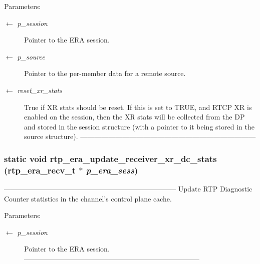 \begin{Desc}
\item[Parameters:]
\begin{description}
\item[\mbox{$\leftarrow$} {\em p\_\-session}]Pointer to the ERA session. \item[\mbox{$\leftarrow$} {\em p\_\-source}]Pointer to the per-member data for a remote source. \item[\mbox{$\leftarrow$} {\em reset\_\-xr\_\-stats}]True if XR stats should be reset. If this is set to TRUE, and RTCP XR is enabled on the session, then the XR stats will be collected from the DP and stored in the session structure (with a pointer to it being stored in the source structure). --------------------------------------------------------------------------- \end{description}
\end{Desc}
\subsubsection{\setlength{\rightskip}{0pt plus 5cm}static void rtp\_\-era\_\-update\_\-receiver\_\-xr\_\-dc\_\-stats (\bf{rtp\_\-era\_\-recv\_\-t} $\ast$ {\em p\_\-era\_\-sess})\hspace{0.3cm}{\tt  [static]}}\label{rtp__era__recv_8c_e66af996a5a77a55bf14c06af95321f5}


-------------------------------------------------------------------------- Update RTP Diagnostic Counter statistics in the channel's control plane cache.

\begin{Desc}
\item[Parameters:]
\begin{description}
\item[\mbox{$\leftarrow$} {\em p\_\-session}]Pointer to the ERA session. --------------------------------------------------------------------------- \end{description}
\end{Desc}
